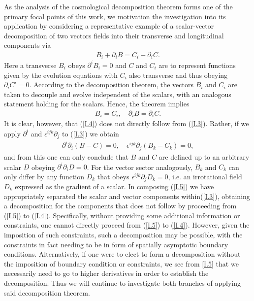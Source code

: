 As the analysis of the cosmological decomposition theorem forms one of the primary focal points of this work, we motivation the investigation into its application by considering a representative example of a scalar-vector decomposition of two vectors fields into their transverse and longitudinal components via
%
\begin{eqnarray}
B_i+\partial_iB=C_i+\partial_iC.
\label{I.3}
\end{eqnarray}
%
Here a transverse $B_i$ obeys $\partial^i B_i = 0$ and $C$ and $C_i$ are to represent functions given by the evolution equations with $C_i$ also transverse and thus obeying $\partial_iC^i=0$. According to the decomposition theorem, the vectors $B_i$ and $C_i$ are taken to decouple and evolve independent of the scalars, with an analogous statement holding for the scalars. Hence, the theorem implies
%
\begin{eqnarray}
B_i= C_i,\quad \partial_iB=\partial_iC.
\label{I.4}
\end{eqnarray}
%
It is clear, however, that (\ref{I.4}) does not directly follow from (\ref{I.3}). Rather, if we apply $\partial^i$ and $\epsilon^{ijk}\partial_j$  to (\ref{I.3}) we obtain 
%
\begin{eqnarray}
\partial^i\partial_i(B-C)=0,\quad \epsilon^{ijk}\partial_j(B_k-C_k)=0,
\label{I.5}
\end{eqnarray}
%
and from this one can only conclude that $B$ and $C$ are defined up to an arbitrary scalar $D$ obeying $\partial^i\partial_iD=0$. For the vector sector analogously, $B_k$ and $C_k$ can only differ by any function $D_k$ that obeys $\epsilon^{ijk}\partial_jD_k=0$, i.e. an irrotational field $D_k$ expressed as the gradient of a scalar. In composing (\ref{I.5}) we have appropriately separated the scalar and vector components within(\ref{I.3}), obtaining a decomposition for the components that does not follow by proceeding from (\ref{I.5}) to (\ref{I.4}). Specifically, without providing some additional information or constraints, one cannot directly proceed from (\ref{I.5}) to (\ref{I.4}). However, given the imposition of such constraints, such a decomposition may be possible, with the constraints in fact needing to be in form of spatially asymptotic boundary conditions. Alternatively, if one were to elect to form a decomposition without the imposition of boundary condition or constraints, we see from \eqref{I.5} that we necessarily need to go to higher derivatives in order to establish the decomposition. Thus we will continue to investigate both branches of applying said decomposition theorem.


